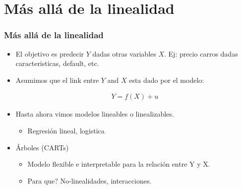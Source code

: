 \documentclass[
  shownotes,
  xcolor={svgnames},
  hyperref={colorlinks,citecolor=DarkBlue,linkcolor=DarkRed,urlcolor=DarkBlue}
  , aspectratio=169]{beamer}
\begin{document}
\section{Más allá de la linealidad}
\begin{frame}
\frametitle{Más allá de la linealidad}


    \begin{itemize}
      \item El objetivo es predecir $Y$ dadas otras variables $X$. Ej: precio carros dadas caracteristicas, default, etc.
      \bigskip
      \item Asumimos que el link entre $Y$ and $X$ esta dado por el modelo:

        \bigskip
        \begin{align}
          Y = f(X) + u
        \end{align}

    \item Hasta ahora vimos modelos lineables o linealizables.
    \begin{itemize}
      \item Regresión lineal, logistica
    \end{itemize}


  \item Árboles (CARTs) 
  \begin{itemize}
    \item Modelo flexible e interpretable para la relación entre Y y X.
    \item Para que? No-linealidades,  interacciones.
  \end{itemize}
    
 
\end{itemize}





\end{frame}
\end{document}
